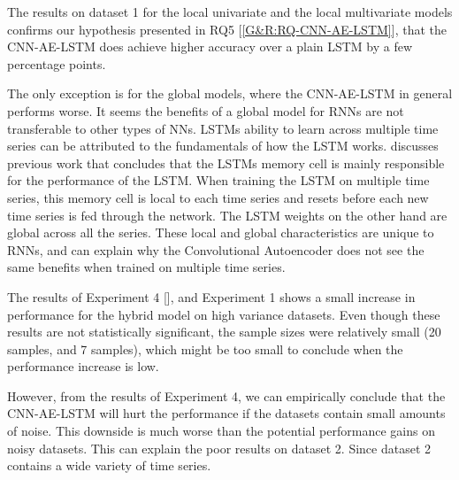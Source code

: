 
The results on dataset 1 for the local univariate and the local multivariate models
confirms our hypothesis presented in RQ5 [\ref{G&R:RQ-CNN-AE-LSTM}], that the
CNN-AE-LSTM does achieve higher accuracy over a plain LSTM by a few percentage points.

The only exception is for the global models, where the CNN-AE-LSTM in general performs worse.
It seems the benefits of a global model for RNNs are not transferable to other types
of NNs. LSTMs ability to learn across multiple time series can be attributed to the fundamentals
of how the LSTM works. \cite{Zhao2019} discusses previous work that concludes that
the LSTMs memory cell is mainly responsible for the performance of the LSTM.
When training the LSTM on multiple time series, this memory cell is local to each
time series and resets before each new time series is fed through the network.
The LSTM weights on the other hand are global across all the series.
These local and global characteristics are unique to RNNs, and can explain
why the Convolutional Autoencoder does not see the same benefits when trained on multiple
time series.

The results of Experiment 4 [],
and Experiment 1 shows a small increase in performance for the hybrid model on high variance datasets.
Even though these results are not statistically significant, the sample sizes were relatively small
(20 samples, and 7 samples), which might be too small to conclude when the
performance increase is low.

However, from the results of Experiment 4, we can empirically conclude that the CNN-AE-LSTM will
hurt the performance if the datasets contain small amounts of noise. This downside is much
worse than the potential performance gains on noisy datasets.
This can explain the poor results on dataset 2. Since dataset 2 contains a wide variety
of time series.





